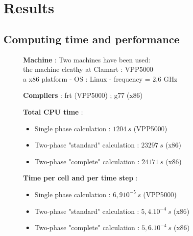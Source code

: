 \documentclass[a4paper,twoside,12pt]{article}
\begin{document}
\section{Results}

\subsection{Computing time and performance}

\begin{description}

   \item[]\textbf{Machine} : Two machines have been used: \\
         the machine clcathy at Clamart : VPP5000 \\
         a x86 platform - OS : Linux - frequency = 2,6 GHz
   \item[]\textbf{Compilers} : frt (VPP5000) ; g77 (x86)
   \item[]\textbf{Total CPU time} :
         \begin{itemize}
            \item Single phase calculation :  $1204~s$ (VPP5000)
            \item Two-phase "standard" calculation :  $23297~s$ (x86)
            \item Two-phase "complete" calculation :  $24171~s$ (x86)
         \end{itemize}
   \item[]\textbf{Time per cell and per time step} :
         \begin{itemize}
            \item Single phase calculation : $6,9 10^{-5}~s$  (VPP5000)
            \item Two-phase "standard" calculation :  $5,4.10^{-4}~s$ (x86)
            \item Two-phase "complete" calculation :  $5,6.10^{-4}~s$ (x86)
         \end{itemize}


\end{description}
\end{document}
